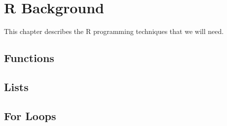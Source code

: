 \chapter{R Background}

This chapter describes the R programming techniques that we will need.

\section{Functions}

\section{Lists}

\section{For Loops}

